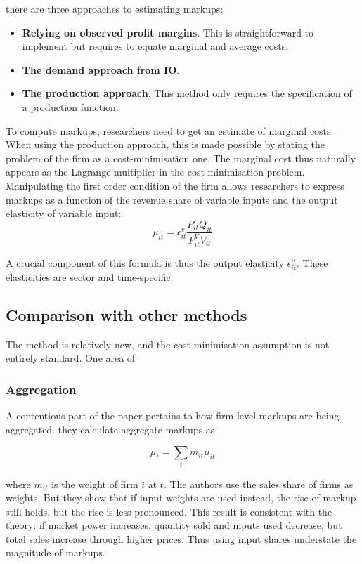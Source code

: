 \documentclass{amsart}
\theoremstyle{definition}
\theoremstyle{remark}
\numberwithin{equation}{section}
\begin{document}
there are three approaches to estimating markups:
\begin{itemize}
    \item \textbf{Relying on observed profit margins}. This is straightforward to implement but requires to equate marginal and average costs.
    \item \textbf{The demand approach from IO}.
    \item \textbf{The production approach}. This method only requires the specification of a production function.
\end{itemize}

To compute markups, researchers need to get an estimate of marginal costs. When using the production approach, this is made possible by stating the problem of the firm as a cost-minimisation one. The marginal cost thus naturally appears as the Lagrange multiplier in the cost-minimisation problem. Manipulating the first order condition of the firm allows researchers to express markups as a function of the revenue share of variable inputs and the output elasticity of variable input: $$\mu_{i t}=\epsilon_{i t}^v \frac{P_{i t} Q_{i t}}{P_{i t}^{V} V_{i t}}$$

A crucial component of this formula is thus the output elasticity $\epsilon_{i t}^v$. These elasticities are sector and time-specific.\\

\subsection*{Comparison with other methods} The method is relatively new, and the cost-minimisation assumption is not entirely standard. One area of 

\subsubsection{Aggregation} A contentious part of the paper pertains to how firm-level markups are being aggregated. they calculate aggregate markups as

$$ \mu_{t}=\sum_{i} m_{i t} \mu_{i t} $$ 

where $m_{it}$ is the weight of firm $i$ at $t$. The authors use the sales share of firms as weights. But they show that if input weights are used instead, the rise of markup still holds, but the rise is less pronounced. This result is consistent with the theory: if market power increases, quantity sold and inputs used decrease, but total sales increase through higher prices. Thus using input shares understate the magnitude of markups.\\
\end{document}
